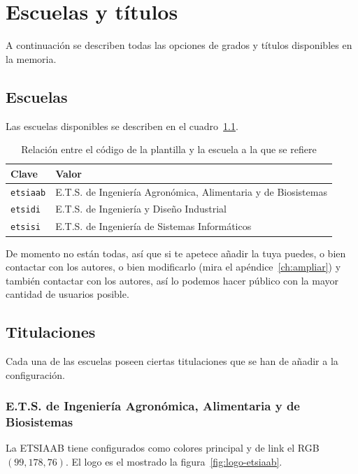 \chapter{Escuelas y títulos}
\label{ch:escuelas-y-titulos}

A continuación se describen todas las opciones de grados y títulos disponibles en la memoria.

\section{Escuelas}

Las escuelas disponibles se describen en el cuadro~\ref{tbl:schools}.

\begin{table}[h]
    \centering
    \begin{tabularx}{\textwidth}{@{}lX@{}}
        \toprule
        \textbf{Clave}   & \textbf{Valor} \\
        \midrule
        \texttt{etsiaab} & E.T.S. de Ingeniería Agronómica, Alimentaria y de Biosistemas \\
        \texttt{etsidi}  & E.T.S. de Ingeniería y Diseño Industrial \\
        \texttt{etsisi}  & E.T.S. de Ingeniería de Sistemas Informáticos \\
        \bottomrule
    \end{tabularx}
    \caption{\label{tbl:schools} Relación entre el código de la plantilla y la escuela a la que se refiere}
\end{table}

De momento no están todas, así que si te apetece añadir la tuya puedes, o bien contactar con los autores, o bien modificarlo (mira el apéndice~\ref{ch:ampliar}) y también contactar con los autores, así lo podemos hacer público con la mayor cantidad de usuarios posible.

\section{Titulaciones}

Cada una de las escuelas poseen ciertas titulaciones que se han de añadir a la configuración.

\subsection{E.T.S. de Ingeniería Agronómica, Alimentaria y de Biosistemas}

La ETSIAAB tiene configurados como colores principal y de link el RGB $(99,178,76)$. El logo es el mostrado la figura~\ref{fig:logo-etsiaab}.

